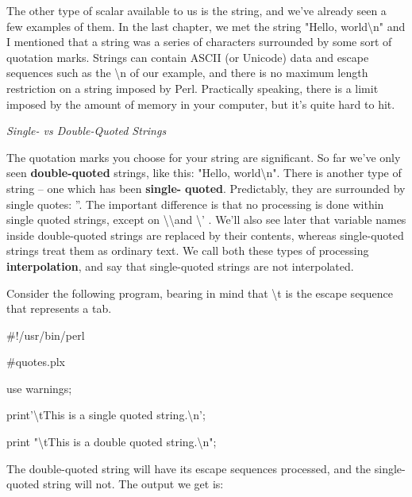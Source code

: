 \documentclass[a4paper,11pt]{book}
\begin{document}
\noindent The other type of scalar available to us is the string, and we've already seen a few examples of them. In the last chapter, we met the string "Hello, world\textbackslash n" and I mentioned that a string was a series of characters surrounded by some sort of quotation marks. Strings can contain ASCII (or Unicode) data and escape sequences such as the \textbackslash n of our example, and there is no maximum length restriction on a string imposed by Perl. Practically speaking, there is a limit imposed by the amount of memory in your computer, but it's quite hard to hit.

\noindent 

\noindent \textit{Single- vs Double-Quoted Strings}

\noindent The quotation marks you choose for your string are significant. So far we've only seen \textbf{double-quoted} strings, like this: "Hello, world\textbackslash n". There is another type of string -- one which has been \textbf{single-} \textbf{quoted}. Predictably, they are surrounded by single quotes: ''. The important difference is that no processing is done within single quoted strings, except on \textbackslash \textbackslash  and \textbackslash ' . We'll also see later that variable names inside double-quoted strings are replaced by their contents, whereas single-quoted strings treat them as ordinary text. We call both these types of processing \textbf{interpolation}, and say that single-quoted strings are not interpolated.

\noindent 

\noindent 

\noindent Consider the following program, bearing in mind that \textbackslash t is the escape sequence that represents a tab.

\noindent 

\noindent \#!/usr/bin/perl

\noindent \#quotes.plx

\noindent use warnings;

\noindent print'\textbackslash tThis is a single quoted string.\textbackslash n';

\noindent print "\textbackslash tThis is a double quoted string.\textbackslash n";

\noindent 

\noindent The double-quoted string will have its escape sequences processed, and the single-quoted string will not. The output we get is:

\noindent 
\end{document}
